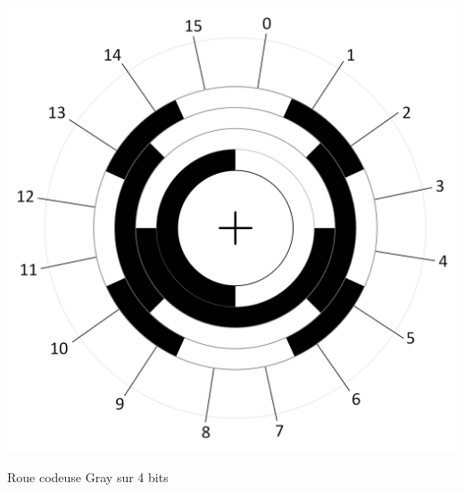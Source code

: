 \documentclass[11pt,a4paper]{article}
\begin{document}
\begin{table}[!ht]
  \centering
  \begin{minipage}{0.45\textwidth}
    \centering

  \includegraphics[scale=0.35]{img/BCD_Gray/Roue_Codeuse_Gray_4bits.png}


  Roue codeuse Gray sur 4 bits

%
%
%


\end{minipage}
\end{table}
\end{document}
